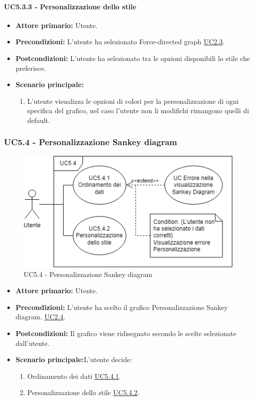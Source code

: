 \paragraph{UC5.3.3 - Personalizzazione dello stile}
\label{sec:UC5.3.3}
    \begin{itemize}
        \item \textbf{Attore primario:} Utente.
        \item \textbf{Precondizioni:} L'utente ha selezionato Force-directed graph \hyperref[sec:UC2.3]{UC2.3}.
	    \item \textbf{Postcondizioni:} L'utente ha selezionato tra le opzioni disponibili lo stile che preferisce.
	    \item \textbf{Scenario principale:} 
	    \begin{enumerate}
	    		\item L'utente visualizza le opzioni di colori per la personalizzazione di ogni specifica del grafico, nel caso l'utente non li modifichi rimangono quelli di default.
		\end{enumerate}
    \end{itemize}

\subsubsection{UC5.4 - Personalizzazione Sankey diagram}
\label{sec:UC5.4}
\begin{figure}[h!]
	\centering
	\includegraphics[scale=0.55]{../../assets/personalizzazioneSankey.drawio.png}
	\caption{UC5.4 - Personalizzazione Sankey diagram}
\end{figure}
\begin{itemize}
    \item \textbf{Attore primario:} Utente.
	\item \textbf{Precondizioni:} L'utente ha scelto il grafico Personalizzazione Sankey diagram. \hyperref[sec:UC2.4]{UC2.4}.
	\item \textbf{Postcondizioni:} Il grafico viene ridisegnato secondo le scelte selezionate dall'utente.
	\item \textbf{Scenario principale:}L'utente decide:
	\begin{enumerate}
        \item Ordinamento dei dati \hyperref[sec:UC5.4.1]{UC5.4.1}.
        \item Personalizzazione dello stile \hyperref[sec:UC5.4.2]{UC5.4.2}.
    \end{enumerate}
\end{itemize}
